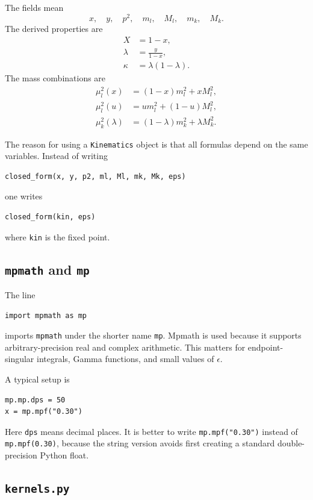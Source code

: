 \documentclass[11pt,a4paper]{article}
\begin{document}
The fields mean
\begin{equation}
  x,\quad y,\quad p^2,\quad m_l,\quad M_l,\quad m_k,\quad M_k.
\end{equation}
The derived properties are
\begin{align}
  X &= 1-x,\\
  \lambda &= \frac{y}{1-x},\\
  \kappa &= \lambda(1-\lambda).
\end{align}
The mass combinations are
\begin{align}
  \mu_l^2(x) &= (1-x)m_l^2+xM_l^2,\\
  \mu_l^2(u) &= u m_l^2+(1-u)M_l^2,\\
  \mu_k^2(\lambda) &= (1-\lambda)m_k^2+\lambda M_k^2.
\end{align}

The reason for using a \texttt{Kinematics} object is that all formulas depend on the same variables. Instead of writing
\begin{lstlisting}
closed_form(x, y, p2, ml, Ml, mk, Mk, eps)
\end{lstlisting}
one writes
\begin{lstlisting}
closed_form(kin, eps)
\end{lstlisting}
where \texttt{kin} is the fixed point.

\subsection{\texttt{mpmath} and \texttt{mp}}

The line
\begin{lstlisting}
import mpmath as mp
\end{lstlisting}
imports \texttt{mpmath} under the shorter name \texttt{mp}. Mpmath is used because it supports arbitrary-precision real and complex arithmetic. This matters for endpoint-singular integrals, Gamma functions, and small values of \(\epsilon\).

A typical setup is
\begin{lstlisting}
mp.mp.dps = 50
x = mp.mpf("0.30")
\end{lstlisting}
Here \texttt{dps} means decimal places. It is better to write \texttt{mp.mpf("0.30")} instead of \texttt{mp.mpf(0.30)}, because the string version avoids first creating a standard double-precision Python float.

\subsection{\texttt{kernels.py}}
\end{document}
